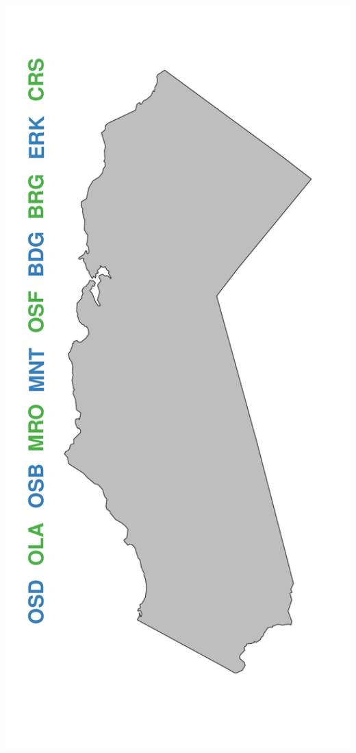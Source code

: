 \documentclass[ xcolor = pdftex, dvipsnames, table ]{beamer}
\begin{document}
\begin{frame}
{\begin{minipage}[h!]{0.19\textwidth}
\end{minipage}
\begin{minipage}[h!]{0.19\textwidth}
        \hspace*{0.25cm}
        \includegraphics[width=1.2\textwidth]{../pictures/mapFullEveryOther.pdf}

\end{minipage}}
\end{frame}
\end{document}

